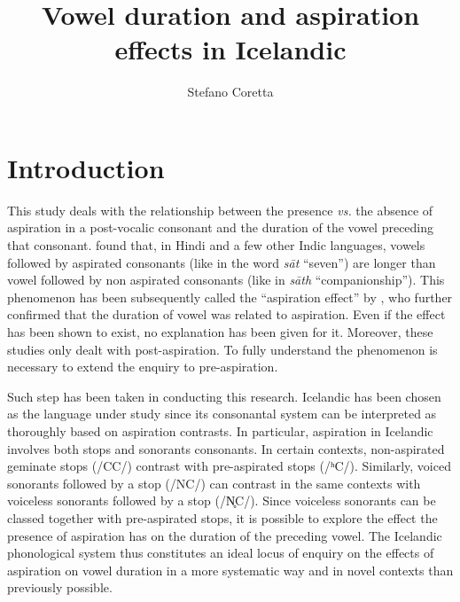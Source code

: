 \documentclass[11pt,a4paper,openany]{memoir}\usepackage[]{graphicx}\usepackage[]{color}
\title{Vowel duration and aspiration effects in Icelandic}
\author{Stefano Coretta}
\begin{document}
\frontmatter

\begin{titlingpage}
\maketitle
\end{titlingpage}

\tableofcontents*





\mainmatter


\chapter{Introduction}
\label{c:introduction}

This study deals with the relationship between the presence \textit{vs.} the absence of aspiration in a post-vocalic consonant and the duration of the vowel preceding that consonant.
\citet{maddieson1976,maddieson1976a} found that, in Hindi and a few other Indic languages, vowels followed by aspirated consonants (like in the word \textit{sāt} ``seven'') are longer than vowel followed by non aspirated consonants (like in \textit{sāth} ``companionship'').
This phenomenon has been subsequently called the ``aspiration effect'' by \citet{durvasula2012}, who further confirmed that the duration of vowel was related to aspiration.
Even if the effect has been shown to exist, no explanation has been given for it.
Moreover, these studies only dealt with post-aspiration.
To fully understand the phenomenon is necessary to extend the enquiry to pre-aspiration.

Such step has been taken in conducting this research.
Icelandic has been chosen as the language under study since its consonantal system can be interpreted as thoroughly based on aspiration contrasts.
In particular, aspiration in Icelandic involves both stops and sonorants consonants.
In certain contexts, non-aspirated geminate stops (/CC/) contrast with pre-aspirated stops (/ʰC/).
Similarly, voiced sonorants followed by a stop (/NC/) can contrast in the same contexts with voiceless sonorants followed by a stop (/N̥C/).
Since voiceless sonorants can be classed together with pre-aspirated stops, it is possible to explore the effect the presence of aspiration has on the duration of the preceding vowel.
The Icelandic phonological system thus constitutes an ideal locus of enquiry on the effects of aspiration on vowel duration in a more systematic way and in novel contexts than previously possible.
\end{document}
